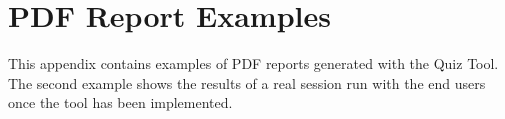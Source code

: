 \chapter{PDF Report Examples}
\label{chap:pdfreports}

This appendix contains examples of PDF reports generated with the Quiz Tool.
The second example shows the results of a real session run with the end users
once the tool has been implemented.


% 
